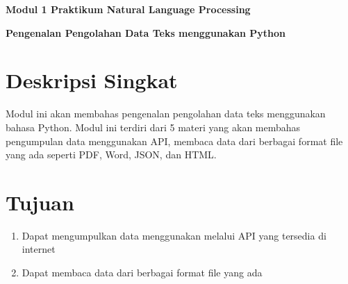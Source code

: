 \documentclass{article}
\begin{document}
    \begin{center}
        \textbf{Modul 1 Praktikum Natural Language Processing}

        \textbf{Pengenalan Pengolahan Data Teks menggunakan Python}
    \end{center}

    \section*{Deskripsi Singkat}
    Modul ini akan membahas pengenalan pengolahan data teks menggunakan bahasa Python. Modul ini terdiri dari 5 materi yang akan membahas pengumpulan data menggunakan API, membaca data dari berbagai format file yang ada seperti PDF, Word, JSON, dan HTML.

    \section*{Tujuan}
    \begin{enumerate}
        \item Dapat mengumpulkan data menggunakan melalui API yang tersedia di internet
        \item Dapat membaca data dari berbagai format file yang ada
    \end{enumerate}
\end{document}
